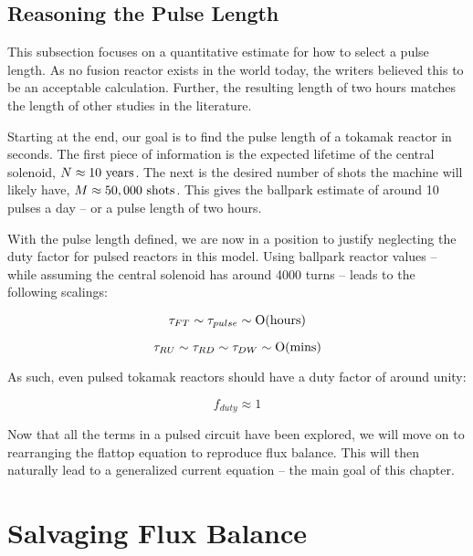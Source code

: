\subsection{Reasoning the Pulse Length}

\label{section:pulse}

This subsection focuses on a quantitative estimate for how to select a pulse length. As no fusion reactor exists in the world today, the writers believed this to be an acceptable calculation. Further, the resulting length of two hours matches the length of other studies in the literature.

Starting at the end, our goal is to find the pulse length of a tokamak reactor in seconds.  The first piece of information is the expected lifetime of the central solenoid, $ N \approx 10 \ \textnormal{years} $. The next is the desired number of shots the machine will likely have, $ M \approx 50,000 \ \textnormal{shots} $. This gives the ballpark estimate of around 10 pulses a day -- or a pulse length of two hours.

With the pulse length defined, we are now in a position to justify neglecting the duty factor for pulsed reactors in this model. Using ballpark reactor values -- while assuming the central solenoid has around 4000 turns -- leads to the following scalings:

\begin{equation}
	\tau_{FT} \sim \tau_{pulse} \sim \textnormal{O(hours)}
\end{equation}

\begin{equation}
	\tau_{RU} \sim \tau_{RD} \sim \tau_{DW} \sim \textnormal{O(mins)}
\end{equation}

As such, even pulsed tokamak reactors should have a duty factor of around unity:

\begin{equation}
	f_{duty} \approx 1
\end{equation}

Now that all the terms in a pulsed circuit have been explored, we will move on to rearranging the flattop equation to reproduce flux balance. This will then naturally lead to a generalized current equation -- the main goal of this chapter.

\section{Salvaging Flux Balance}


